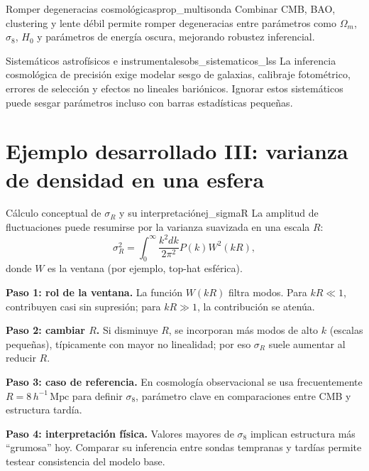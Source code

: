 \begin{proposicion}{Romper degeneracias cosmológicas}{prop_multisonda}
Combinar CMB, BAO, clustering y lente débil permite romper degeneracias entre parámetros como $\Omega_m$, $\sigma_8$, $H_0$ y parámetros de energía oscura, mejorando robustez inferencial.
\end{proposicion}

\begin{observacion}{Sistemáticos astrofísicos e instrumentales}{obs_sistematicos_lss}
La inferencia cosmológica de precisión exige modelar sesgo de galaxias, calibraje fotométrico, errores de selección y efectos no lineales bariónicos. Ignorar estos sistemáticos puede sesgar parámetros incluso con barras estadísticas pequeñas.
\end{observacion}

\section{Ejemplo desarrollado III: varianza de densidad en una esfera}
\label{sec:ejemplo_sigmaR}

\begin{ejemplo}{Cálculo conceptual de $\sigma_R$ y su interpretación}{ej_sigmaR}
La amplitud de fluctuaciones puede resumirse por la varianza suavizada en una escala $R$:
\begin{equation}
\sigma_R^2=\int_0^\infty\frac{k^2dk}{2\pi^2}P(k)W^2(kR),
\end{equation}
donde $W$ es la ventana (por ejemplo, top-hat esférica).

\textbf{Paso 1: rol de la ventana.} La función $W(kR)$ filtra modos. Para $kR\ll1$, contribuyen casi sin supresión; para $kR\gg1$, la contribución se atenúa.

\textbf{Paso 2: cambiar $R$.} Si disminuye $R$, se incorporan más modos de alto $k$ (escalas pequeñas), típicamente con mayor no linealidad; por eso $\sigma_R$ suele aumentar al reducir $R$.

\textbf{Paso 3: caso de referencia.} En cosmología observacional se usa frecuentemente $R=8\,h^{-1}\,\mathrm{Mpc}$ para definir $\sigma_8$, parámetro clave en comparaciones entre CMB y estructura tardía.

\textbf{Paso 4: interpretación física.} Valores mayores de $\sigma_8$ implican estructura más ``grumosa'' hoy. Comparar su inferencia entre sondas tempranas y tardías permite testear consistencia del modelo base.
\end{ejemplo}

